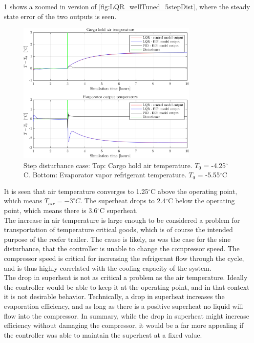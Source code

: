 \noindent \cref{fig:LQR_wellTuned_5stepDist_zoom} shows a zoomed in version of \cref{fig:LQR_wellTuned_5stepDist}, where the steady state error of the two outputs is seen.

\begin{figure}[H]
	\centering
	\includegraphics[width=0.8\textwidth]{Graphics/fig_LQRvsKresten_stepDist_zoom.png}
	\caption{Step disturbance case: Top: Cargo hold air temperature. $T_0$ = -4.25$^{\circ}$C. Bottom: Evaporator vapor refrigerant temperature. $T_0$ = -5.55$^{\circ}$C}
	\label{fig:LQR_wellTuned_5stepDist_zoom}
\end{figure}

\noindent It is seen that air temperature converges to 1.25$^{\circ}$C above the operating point, which means $T_{air} = -3^{\circ}C$. The superheat drops to 2.4$^{\circ}$C below the operating point, which means there is 3.6$^{\circ}$C superheat.\\

The increase in air temperature is large enough to be considered a problem for transportation of temperature critical goods, which is of course the intended purpose of the reefer trailer. The cause is likely, as was the case for the sine disturbance, that the controller is unable to change the compressor speed. The compressor speed is critical for increasing the refrigerant flow through the cycle, and is thus highly correlated with the cooling capacity of the system. \\

The drop in superheat is not as critical a problem as the air temperature. Ideally the controller would be able to keep it at the operating point, and in that context it is not desirable behavior. Technically, a drop in superheat increases the evaporation efficiency, and as long as there is a positive superheat no liquid will flow into the compressor. In summary, while the drop in superheat might increase efficiency without damaging the compressor, it would be a far more appealing if the controller was able to maintain the superheat at a fixed value.

